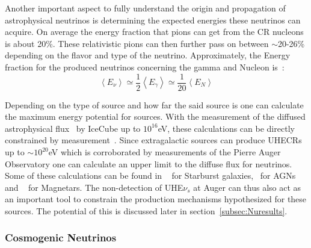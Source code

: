 Another important aspect to fully understand the origin and propagation of astrophysical neutrinos is determining the expected energies these neutrinos can acquire. On average the energy fraction that pions can get from the CR nucleons is about 20\%. These relativistic pions can then further pass on between $\sim$20-26\% depending on the flavor and type of the neutrino. Approximately, the Energy fraction for the produced neutrinos concerning the gamma and Nucleon is~\cite{Lipari_2007}:
\begin{equation}
  \left\langle E_{\nu} \right\rangle  \simeq  \frac{1}{2}\left\langle E_{\gamma} \right\rangle \simeq  \frac{1}{20}\left\langle E_{N} \right\rangle
  \end{equation}

Depending on the type of source and how far the said source is one can calculate the maximum energy potential for sources. With the measurement of the diffused astrophysical flux~\cite{PhysRevD.110.022001} by IceCube up to $10^{16}$eV, these calculations can be directly constrained by measurement~\cite{Abbasi_2023_supernova_emission}. Since extragalactic sources can produce UHECRs up to $\sim 10^{20}$eV which is corroborated by measurements of the Pierre Auger Observatory one can calculate an upper limit to the diffuse flux for neutrinos. Some of these calculations can be found in ~\cite{Condorelli_2023_starburst} for Starburst galaxies, ~\cite{Murase_2023}for AGNs and ~\cite{2003ApJ...595..346Z} for Magnetars. The non-detection of UHE$\nu_s$ at Auger can thus also act as an important tool to constrain the production mechanisms hypothesized for these sources. The potential of this is discussed later in section~\ref{subsec:Nuresults}.   

\subsubsection*{Cosmogenic Neutrinos}
\label{subsubsec:CosmoNu}

